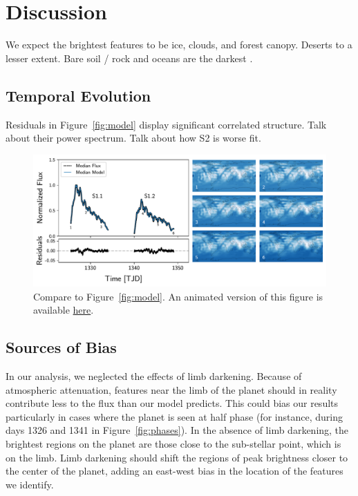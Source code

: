 \documentclass[modern]{aastex62}
\begin{document}
\section{Discussion}
\label{sec:discussion}

We expect the brightest features to be ice, clouds, and forest canopy. Deserts
to a lesser extent. Bare soil / rock and oceans are the darkest \citep{Jedlovec2009}.

\subsection{Temporal Evolution}

Residuals in Figure~\ref{fig:model} display significant correlated
structure. Talk about their power spectrum. Talk about how S2 is worse fit.

\begin{figure}[t!]
    \begin{centering}
    \includegraphics[width=\linewidth]{figures/map_temporal.pdf}
    \caption{\label{fig:map_temporal}
             Compare to Figure~\ref{fig:model}. An animated version
             of this figure is available 
             \href{https://github.com/rodluger/earthshine/blob/master/tex/figures/map_temporal.mp4}{here}.
             }
    \end{centering}
\end{figure}

\subsection{Sources of Bias}

In our analysis, we neglected the effects of limb darkening. Because of
atmospheric attenuation, features near the limb of the planet should in
reality contribute less to the flux than our model predicts. This could
bias our results particularly in cases where the planet is seen at half
phase (for instance, during days 1326 and 1341 in Figure~\ref{fig:phases}).
In the absence of limb darkening, the brightest regions on the planet are those
close to the sub-stellar point, which is on the limb. Limb darkening should
shift the regions of peak brightness closer to the center of the planet, adding
an east-west bias in the location of the features we identify.
\end{document}
